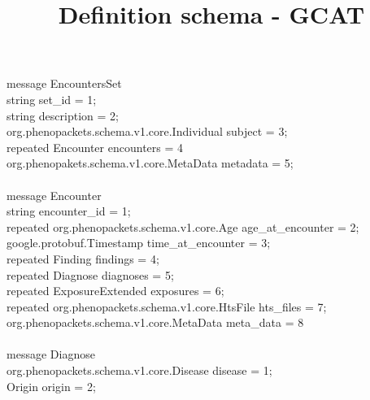 \documentclass[a4paper, 10pt]{article}
\title{Definition schema - GCAT}
\begin{document}
\date{}
\maketitle








message \colorbox{yellow!80}{EncountersSet} \ {  \\
    string set\_id = 1;\\
    string description = 2;\\
    org.phenopackets.schema.v1.core.Individual subject = 3;\\
    repeated \colorbox{yellow!80}{Encounter} encounters = 4 \\
    org.phenopakets.schema.v1.core.MetaData metadata = 5; \\
\ } \\
 



message \colorbox{yellow!80}{Encounter} \ { \\ 
    string encounter\_id = 1; \\
    repeated org.phenopackets.schema.v1.core.Age age\_at\_encounter = 2; \\
    google.protobuf.Timestamp time\_at\_encounter = 3; \\
    repeated \colorbox{yellow!80}{Finding} findings = 4; \\
    repeated \colorbox{yellow!80}{Diagnose} diagnoses = 5; \\
    repeated \colorbox{yellow!80}{ExposureExtended} exposures = 6; \\
    repeated org.phenopackets.schema.v1.core.HtsFile hts\_files = 7; \\
    org.phenopackets.schema.v1.core.MetaData meta\_data = 8 \\
\ } \\







message \colorbox{yellow!80}{Diagnose} \ { \\   
    org.phenopackets.schema.v1.core.Disease disease = 1; \\
    \colorbox{yellow!80}{Origin} origin = 2;
\ } \\
\end{document}

